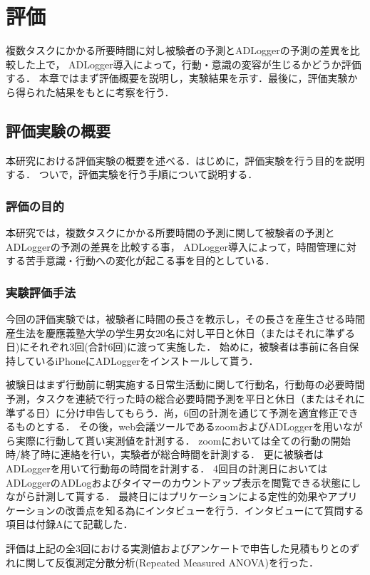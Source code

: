 \chapter{評価}
複数タスクにかかる所要時間に対し被験者の予測とADLoggerの予測の差異を比較した上で，
ADLogger導入によって，行動・意識の変容が生じるかどうか評価する．
本章ではまず評価概要を説明し，実験結果を示す．最後に，評価実験から得られた結果をもとに考察を行う．

\section{評価実験の概要}
本研究における評価実験の概要を述べる．はじめに，評価実験を行う目的を説明する．
ついで，評価実験を行う手順について説明する．

\subsection{評価の目的}
本研究では，複数タスクにかかる所要時間の予測に関して被験者の予測とADLoggerの予測の差異を比較する事，
ADLogger導入によって，時間管理に対する苦手意識・行動への変化が起こる事を目的としている．

\subsection{実験評価手法}
今回の評価実験では，被験者に時間の長さを教示し，その長さを産生させる時間産生法\cite{Oguro1961}\cite{Tayama2018}を慶應義塾大学の学生男女20名に対し平日と休日（またはそれに準ずる日)にそれぞれ3回(合計6回)に渡って実施した．
始めに，被験者は事前に各自保持しているiPhoneにADLoggerをインストールして貰う．

被験日はまず行動前に朝実施する日常生活動に関して行動名，行動毎の必要時間予測，タスクを連続で行った時の総合必要時間予測を平日と休日（またはそれに準ずる日）に分け申告してもらう．尚，6回の計測を通じて予測を適宜修正できるものとする．
その後，web会議ツールであるzoom\cite{zoom}およびADLoggerを用いながら実際に行動して貰い実測値を計測する．
zoomにおいては全ての行動の開始時/終了時に連絡を行い，実験者が総合時間を計測する．
更に被験者はADLoggerを用いて行動毎の時間を計測する．
4回目の計測日においてはADLoggerのADLogおよびタイマーのカウントアップ表示を閲覧できる状態にしながら計測して貰する．
最終日にはプリケーションによる定性的効果やアプリケーションの改善点を知る為にインタビューを行う．インタビューにて質問する項目は付録Aにて記載した．

評価は上記の全3回における実測値およびアンケートで申告した見積もりとのずれに関して反復測定分散分析(Repeated Measured ANOVA)を行った．


